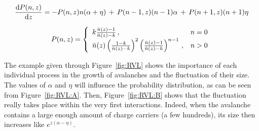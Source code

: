	\begin{equation}
	\label{eq:dRLV}
	\frac{\mathrm{d}{P(n,z)}}{\mathrm{d}{z}} = -P(n,z)n(\alpha+\eta) \, + \, P(n-1,z)(n-1)\alpha \, + \, P(n+1,z)(n+1)\eta
	\end{equation}
	
	\begin{equation}
	\label{eq:sol-RLV}
	P(n,z) = \left\{
				\begin{array}{l l}
  				k\frac{\bar{n}(z)-1}{\bar{n}(z)-k} \, , & n=0\\
  				\bar{n}(z) \left( \frac{1-k}{\bar{n}(z)-k} \right)^2 \left( \frac{\bar{n}(z)-1}{\bar{n}(z)-k} \right)^{n-1} \, , & n>0\\
  				\end{array} \right.
	\end{equation}
	
	The example given through Figure~\ref{fig:RVL} shows the importance of each individual process in the growth of avalanches and the fluctuation of their size. The values of $\alpha$ and $\eta$ will influence the probability distribution, as can be seen from Figure~\ref{fig:RVL:A}. Then, Figure~\ref{fig:RVL:B} shows that the fluctuation really takes place within the very first interactions. Indeed, when the avalanche contains a large enough amount of charge carriers (a few hundreds), its size then increases like $e^{z(\alpha-\eta)}$.
	
